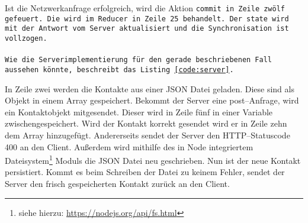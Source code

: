 Ist die Netzwerkanfrage erfolgreich, wird die Aktion \tt{commit} in Zeile zwölf gefeuert. Die wird im Reducer in Zeile 25 behandelt. Der \tt{state} wird mit der Antwort vom Server aktualisiert und die Synchronisation ist vollzogen.\\\\
Wie die Serverimplementierung für den gerade beschriebenen Fall aussehen könnte, beschreibt das Listing \ref{code:server}.
%
\begin{center}  
\end{center}
%
In Zeile zwei werden die Kontakte aus einer \gls{JSON} Datei geladen. Diese sind als Objekt in einem Array gespeichert. Bekommt der Server eine post--Anfrage, wird ein Kontaktobjekt mitgesendet. Dieser wird in Zeile fünf in einer Variable zwischengespeichert. 
Wird der Kontakt korrekt gesendet wird er in Zeile zehn dem Array hinzugefügt. Andererseits sendet der Server den \gls{HTTP}--Statuscode 400 an den Client. %
Außerdem wird mithilfe des in Node integriertem Dateisystem\footnote{siehe hierzu: \url{https://nodejs.org/api/fs.html}} Moduls die \gls{JSON} Datei neu geschrieben. Nun ist der neue Kontakt persistiert. Kommt es beim Schreiben der Datei zu keinem Fehler, sendet der Server den frisch gespeicherten Kontakt zurück an den Client.